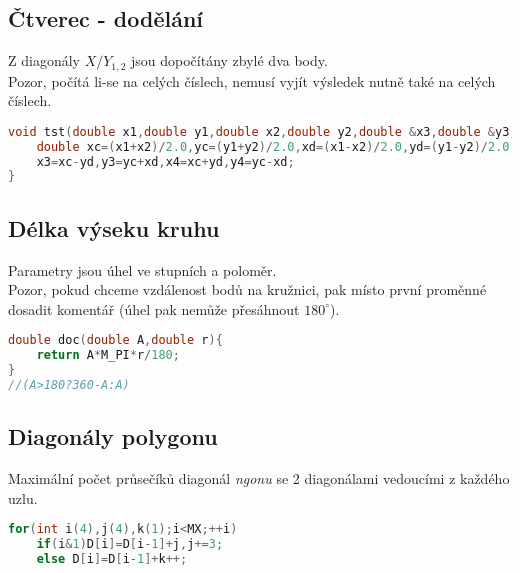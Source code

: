 \documentclass[11pt]{article}
\begin{document}
\subsection{Čtverec - dodělání}
Z diagonály $X/Y_{1,2}$ jsou dopočítány zbylé dva body.
\\Pozor, počítá li-se na celých číslech, nemusí vyjít výsledek nutně také na celých číslech.
\begin{lstlisting}[language=C++]
void tst(double x1,double y1,double x2,double y2,double &x3,double &y3,double &x4,double &y4){
    double xc=(x1+x2)/2.0,yc=(y1+y2)/2.0,xd=(x1-x2)/2.0,yd=(y1-y2)/2.0; 
    x3=xc-yd,y3=yc+xd,x4=xc+yd,y4=yc-xd;
}
\end{lstlisting}
\subsection{Délka výseku kruhu}
Parametry jsou úhel ve stupních a poloměr.
\\Pozor, pokud chceme vzdálenost bodů na kružnici, pak místo první proměnné dosadit komentář (úhel pak nemůže přesáhnout $180^\circ$).
\begin{lstlisting}[language=C++]
double doc(double A,double r){
    return A*M_PI*r/180;
}
//(A>180?360-A:A)
\end{lstlisting}
\subsection{Diagonály polygonu}
Maximální počet průsečíků diagonál \textit{ngonu} se 2 diagonálami vedoucími z každého uzlu.
\begin{lstlisting}[language=C++]
for(int i(4),j(4),k(1);i<MX;++i)
    if(i&1)D[i]=D[i-1]+j,j+=3;
    else D[i]=D[i-1]+k++;
\end{lstlisting}
\end{document}
